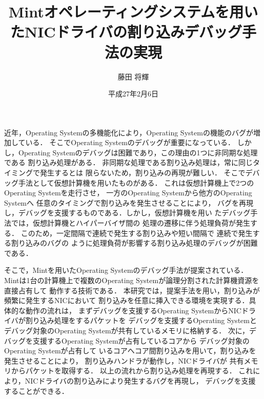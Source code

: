 \documentclass[tanilab-enum]{graduate}
\title{Mintオペレーティングシステムを用いたNICドライバの割り込みデバッグ手法の実現}
\author{藤田 将輝}
\date{平成27年2月6日}
\begin{document}
\maketitle

近年，Operating Systemの多機能化により，Operating Systemの機能のバグが増加している．
そこでOperating Systemのデバッグが重要になっている．
しかし，Operating Systemのデバッグは困難であり，この理由の1つに非同期な処理である
割り込み処理がある．
非同期な処理である割り込み処理は，常に同じタイミングで発生するとは
限らないため，割り込みの再現が難しい．
そこでデバッグ手法として仮想計算機を用いたものがある．
これは仮想計算機上で2つのOperating Systemを走行させ，
一方のOperating Systemから他方のOperating Systemへ
任意のタイミングで割り込みを発生させることにより，
バグを再現し，デバッグを支援するものである．しかし，仮想計算機を用い
たデバッグ手法では，仮想計算機とハイパーバイザ間の
処理の遷移に伴う処理負荷が発生する．
このため，一定間隔で連続で発生する割り込みや短い間隔で
連続で発生する割り込みのバグの
ように処理負荷が影響する割り込み処理のデバッグが困難である．


そこで，Mintを用いたOperating Systemのデバッグ手法が提案されている．
Mintは1台の計算機上で複数のOperating Systemが論理分割された計算機資源を直接占有して
動作する技術である．
本研究では，提案手法を用い，割り込みが頻繁に発生するNICにおいて
割り込みを任意に挿入できる環境を実現する．具体的な動作の流れは，
まずデバッグを支援するOperating SystemからNICドライバが割り込み処理をするパケットを
デバッグを支援するOperating Systemとデバッグ対象のOperating Systemが共有しているメモリに格納する．
次に，デバッグを支援するOperating Systemが占有しているコアから
デバッグ対象のOperating Systemが占有して
いるコアへコア間割り込みを用いて，割り込みを発生させることにより，
割り込みハンドラが動作し，NICドライバが
共有メモリからパケットを取得する．
以上の流れから割り込み処理を再現する．
これにより，NICドライバの割り込みにより発生するバグを再現し，
デバッグを支援することができる．


\tableandlists%
\end{document}
